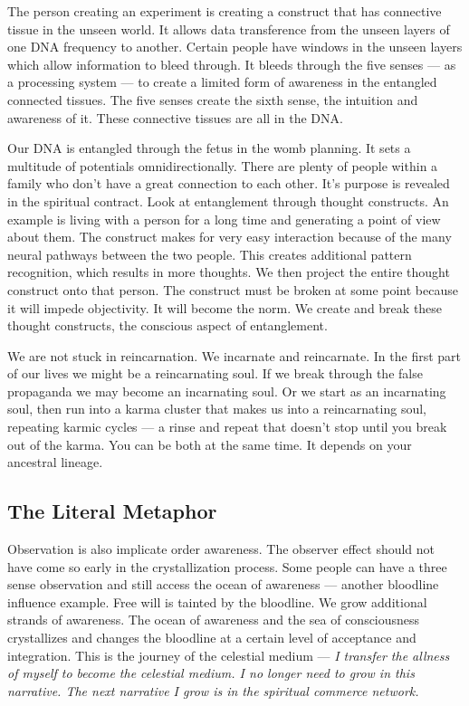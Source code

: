 The person creating an experiment is creating a construct that has
connective tissue in the unseen world. It allows data transference from
the unseen layers of one DNA frequency to another. Certain people have
windows in the unseen layers which allow information to bleed through.
It bleeds through the five senses --- as a processing system --- to
create a limited form of awareness in the entangled connected tissues.
The five senses create the sixth sense, the intuition and awareness of
it. These connective tissues are all in the DNA.

Our DNA is entangled through the fetus in the womb planning. It sets a
multitude of potentials omnidirectionally. There are plenty of people
within a family who don't have a great connection to each other. It's
purpose is revealed in the spiritual contract. Look at entanglement
through thought constructs. An example is living with a person for a
long time and generating a point of view about them. The construct makes
for very easy interaction because of the many neural pathways between
the two people. This creates additional pattern recognition, which
results in more thoughts. We then project the entire thought construct
onto that person. The construct must be broken at some point because it
will impede objectivity. It will become the norm. We create and break
these thought constructs, the conscious aspect of entanglement.

We are not stuck in reincarnation. We incarnate and reincarnate. In the
first part of our lives we might be a reincarnating soul. If we break
through the false propaganda we may become an incarnating soul. Or we
start as an incarnating soul, then run into a karma cluster that makes
us into a reincarnating soul, repeating karmic cycles --- a rinse and
repeat that doesn't stop until you break out of the karma. You can be
both at the same time. It depends on your ancestral lineage.

\subsection{The Literal Metaphor}\label{the-literal-metaphor}

Observation is also implicate order awareness. The observer effect
should not have come so early in the crystallization process. Some
people can have a three sense observation and still access the ocean of
awareness --- another bloodline influence example. Free will is tainted
by the bloodline. We grow additional strands of awareness. The ocean of
awareness and the sea of consciousness crystallizes and changes the
bloodline at a certain level of acceptance and integration. This is the
journey of the celestial medium --- \emph{I transfer the allness of
myself to become the celestial medium. I no longer need to grow in this
narrative. The next narrative I grow is in the spiritual commerce
network.}

